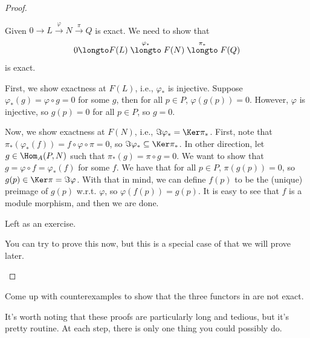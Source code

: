 \begin{proof}
    \begin{alphenum}
    \item Given $0\to L\stackrel\varphi\to N\stackrel\pi\to Q$
    is exact. We need to show that
    $$0\longto F(L)\stackrel{\varphi_*}\longto F(N)
    \stackrel{\pi_*}\longto F(Q)$$ 
    is exact.

    First, we show exactness at $F(L)$,
    i.e., $\varphi_*$ is injective.
    Suppose $\varphi_*(g) =\varphi\circ g = 0$ for some $g$,
    then for all $p\in P$, $\varphi(g(p)) = 0$.
    However, $\varphi$ is injective, so $g(p)=0$ for all $p\in P$,
    so $g=0$.

    Now, we show exactness at $F(N)$, i.e., $\Im\varphi_* = \Ker\pi_*$.
    First, note that $\pi_*(\varphi_*(f)) = f\circ\varphi\circ\pi = 0$, so $\Im\varphi_*\subseteq \Ker\pi_*$.
    In other direction, let $g\in\Hom_A(P,N)$
    such that $\pi_*(g)=\pi\circ g = 0$. We want to show that
    $g=\varphi\circ f=\varphi_*(f)$ for some $f$.
    We have that for all $p\in P$, $\pi(g(p))=0$,
    so $g(p)\in\Ker\pi = \Im\varphi$.
    With that in mind, we can define $f(p)$ to be
    the (unique) preimage of $g(p)$ w.r.t. $\varphi$,
    so $\varphi(f(p)) = g(p)$. It is easy to see that
    $f$ is a module morphism, and then we are done.
    \item Left as an exercise.
    \item You can try to prove this now, but this is a special case of 
    that we will prove later. \qedhere
    \end{alphenum}
\end{proof}
\begin{exercise}
Come up with counterexamples to show that
the three functors in 
are not exact.
\end{exercise}
It's worth noting that these proofs are
particularly long and tedious, but it's pretty routine.
At each step, there is only one thing you could possibly do.


